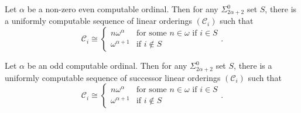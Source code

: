 \documentclass[10pt,a4paper]{amsart}
\newcommand\+[1]{\mathcal{#1}}
\renewcommand\*[1]{\mathbf{#1}}
\renewcommand\=[1]{\text{#1}}
\renewcommand\*[1]{\mathbf{#1}}
\newcommand{\nat}{\omega}
\begin{document}
\begin{lemma}\label{lem:ordinalshard}
  Let $\alpha$ be a non-zero even computable ordinal. Then for any $\Sigma^0_{2\alpha+2}$ set $S$, there is a uniformly computable sequence of linear orderings $(\+C_i)$ such that
  \[ \+C_i\cong\begin{cases} n \omega^\alpha & \text{for some $n\in \nat$ if $i\in S$}\\
  \omega^{\alpha+1} & \text{if } i\not\in S\end{cases}.\]
\end{lemma}
\begin{lemma}\label{lem:succordinalshard}
  Let $\alpha$ be an odd computable ordinal. Then for any $\Sigma^0_{2\alpha+2}$ set $S$, there is a uniformly computable sequence of successor linear orderings $(\+C_i)$ such that
  \[ \+C_i\cong\begin{cases} n\omega^\alpha & \text{for some $n\in \nat$ if $i\in S$}\\
  \omega^{\alpha+1}& \text{if } i\not\in S\end{cases}.\]
\end{lemma}
\end{document}
